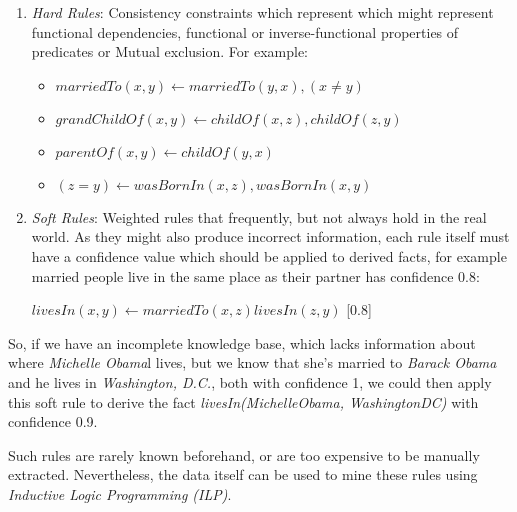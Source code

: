 \begin{enumerate}

 \item \emph{Hard Rules}: Consistency constraints which represent which might represent functional dependencies, functional or inverse-functional properties of predicates or Mutual exclusion. For example:
    \begin{itemize}
      \item \begin{math} marriedTo(x,y) \leftarrow marriedTo(y,x),(x \neq y)\end{math}
      \item \begin{math} grandChildOf(x,y) \leftarrow childOf(x,z),childOf(z,y)\end{math}
      \item \begin{math} parentOf(x,y) \leftarrow childOf(y,x)\end{math}
      \item \begin{math} (z=y) \leftarrow wasBornIn(x,z),wasBornIn(x,y)\end{math}
    \end{itemize}

 \item \emph{Soft Rules}: Weighted rules that frequently, but not always hold in the real world. As they might also produce incorrect information, each rule itself must have a confidence value which should be applied to derived facts, for example married people live in the same place as their partner has confidence 0.8:
    \begin{center}
      \begin{math} livesIn(x,y) \leftarrow marriedTo(x,z)livesIn(z,y)\end{math} [0.8]
    \end{center}
\end{enumerate}

So, if we have an incomplete knowledge base, which lacks information about where \emph{Michelle Obama}l lives, but we know that she's married to \emph{Barack Obama} and he lives in \emph{Washington, D.C.}, both with confidence 1, we could then apply this soft rule to derive the fact \emph{livesIn(MichelleObama, WashingtonDC)} with confidence 0.9.

Such rules are rarely known beforehand, or are too expensive to be manually extracted. Nevertheless, the data itself can be used to mine these rules using \emph{Inductive Logic Programming (ILP)}. 

